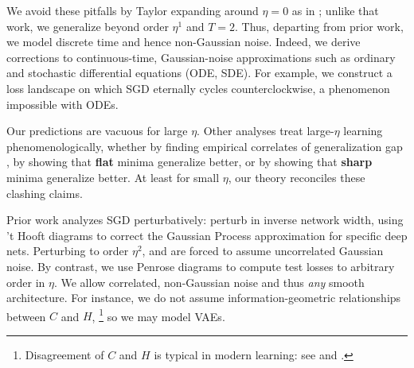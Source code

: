\documentclass[openany, notitlepage, justified]{tufte-book}
\theoremstyle{plain}
\theoremstyle{definition}
\begin{document}
    
    We avoid these pitfalls by Taylor expanding around $\eta=0$ as in
    \citet{ro18}; unlike that work, we generalize beyond order $\eta^1$ and
    $T=2$.
    Thus, departing from prior work, we model discrete time and hence
    non-Gaussian noise.  Indeed, we derive corrections to continuous-time,
    Gaussian-noise approximations such as ordinary and stochastic differential
    equations (ODE, SDE).  For example, we construct a loss landscape on which
    SGD eternally cycles counterclockwise, a phenomenon impossible with ODEs. 
    

    Our predictions are vacuous for large $\eta$.  Other analyses treat
    large-$\eta$ learning phenomenologically, whether by finding empirical
    correlates of generalization gap \citep{li18}, by showing that
    \textbf{flat} minima generalize better,\cite{ho17,ke17,wa18}
    or by showing that \textbf{sharp} minima generalize
    better.\cite{st56,di17,wu18} At least for small $\eta$, our theory
    reconciles these clashing claims.
    

    Prior work analyzes SGD perturbatively: \citet{dy19} perturb in inverse
    network width, using 't Hooft diagrams to correct the Gaussian Process
    approximation for specific deep nets.  Perturbing to order $\eta^2$,
    \citet{ch18} and \citet{li17} are forced to assume uncorrelated Gaussian
    noise.  By contrast, we use Penrose diagrams to compute test losses to
    arbitrary order in $\eta$.  We allow correlated, non-Gaussian
    noise and thus \emph{any} smooth architecture.  For instance, we do not
    assume information-geometric relationships between $C$ and $H$,%
    \footnote{
        Disagreement of $C$ and $H$ is typical in modern
        learning: see \citet{ro12} and \citet{ku19}.
    }
    so we may model VAEs. 
\end{document}
